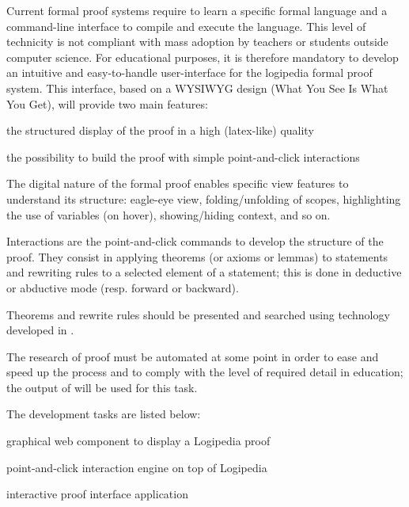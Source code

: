 \begin{workpackage}[id=dissemination,wphases=0-48,type=MGT,
  short=Dissemination,%
  title={Dissemination, communication and exploitation},
  lead=Inr]
\begin{tasklist}
  \begin{task}[id=edukera,
      title=Web interface for doing proofs at school,
      lead=Edu,EduRM=12]
      Current formal proof systems require to learn a specific formal
      language and a command-line interface to compile and execute the
      language.  This level of technicity is not compliant with mass
      adoption by teachers or students outside computer science. For
      educational purposes, it is therefore mandatory to develop an
      intuitive and easy-to-handle user-interface for the logipedia
      formal proof system. This interface, based on a WYSIWYG design
      (What You See Is What You Get), will provide two main features:
      \begin{compactitem}
      \item the structured display of the proof in a high (latex-like) quality
      \item the possibility to build the proof with simple
        point-and-click interactions
      \end{compactitem}

      The digital nature of the formal proof enables specific view features to
      understand its structure: eagle-eye view, folding/unfolding of scopes,
      highlighting the use of variables (on hover), showing/hiding context,
      and so on.

      Interactions are the point-and-click commands to develop the structure
      of the proof. They consist in applying theorems (or axioms or lemmas)
      to statements and rewriting rules to a selected element of a statement;
      this is done in deductive or abductive mode (resp. forward or backward).

      Theorems and rewrite rules should be presented and searched using
      technology developed in .

      The research of proof must be automated at some point in order to ease
      and speed up the process and to comply with the level of required detail
      in education; the output of  will be used for this task.

      The development tasks are listed below:
      \begin{compactitem}
      \item graphical web component to display a Logipedia proof
      \item point-and-click interaction engine on top of Logipedia
      \item interactive proof interface application
      \end{compactitem}


\end{task}
\end{tasklist}
\end{workpackage}
